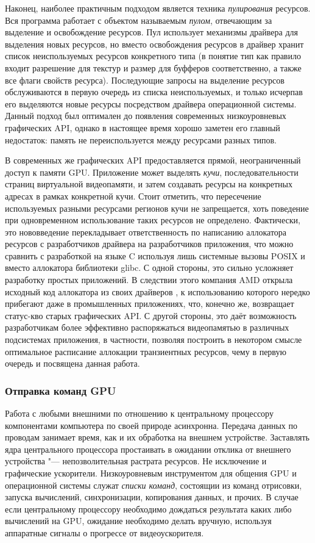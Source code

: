 Наконец, наиболее практичным подходом является техника \textit{пулирования} ресурсов.
Вся программа работает с объектом называемым \textit{пулом}, отвечающим за выделение и освобождение ресурсов.
Пул использует механизмы драйвера для выделения новых ресурсов, но вместо освобождения ресурсов в драйвер хранит список неиспользуемых ресурсов конкретного типа (в понятие тип как правило входит разрешение для текстур и размер для буфферов соответственно, а также все флаги свойств ресурса).
Последующие запросы на выделение ресурсов обслуживаются в первую очередь из списка неиспользуемых, и только исчерпав его выделяются новые ресурсы посредством драйвера операционной системы.
Данный подход был оптимален до появления современных низкоуровневых графических API, однако в настоящее время хорошо заметен его главный недостаток: память не переиспользуется между ресурсами разных типов.

В современных же графических API предоставляется прямой, неограниченный доступ к памяти GPU.
Приложение может выделять \textit{кучи}, последовательности страниц виртуальной видеопамяти, и затем создавать ресурсы на конкретных адресах в рамках конкретной кучи.
Стоит отметить, что пересечение используемых разными ресурсами регионов кучи не запрещается, хоть поведение при одновременном использование таких ресурсов не определено.
Фактически, это нововведение перекладывает ответственность по написанию аллокатора ресурсов с разработчиков драйвера на разработчиков приложения, что можно сравнить с разработкой на языке C используя лишь системные вызовы POSIX  и  вместо аллокатора библиотеки glibc.
С одной стороны, это сильно усложняет разработку простых приложений.
В следствии этого компания AMD открыла исходный код аллокатора из своих драйверов \cite{VMA}, к использованию которого нередко прибегают даже в промышленных приложениях, что, конечно же, возвращает статус-кво старых графических API.
С другой стороны, это даёт возможность разработчикам более эффективно распоряжаться видеопамятью в различных подсистемах приложения, в частности, позволяя построить в некотором смысле оптимальное расписание аллокации транзиентных ресурсов, чему в первую очередь и посвящена данная работа.

\subsubsection{Отправка команд GPU}
Работа с любыми внешними по отношению к центральному процессору компонентами компьютера по своей природе асинхронна.
Передача данных по проводам занимает время, как и их обработка на внешнем устройстве.
Заставлять ядра центрального процессора простаивать в ожидании отклика от внешнего устройства "--- непозволительная растрата ресурсов.
Не исключение и графические ускорители.
Низкоуровневым инструментом для общения GPU и операционной системы служат \textit{списки команд}, состоящии из команд отрисовки, запуска вычислений, синхронизации, копирования данных, и прочих.
В случае если центральному процессору необходимо дождаться результата каких либо вычислений на GPU, ожидание необходимо делать вручную, используя аппаратные сигналы о прогрессе от видеоускорителя.

